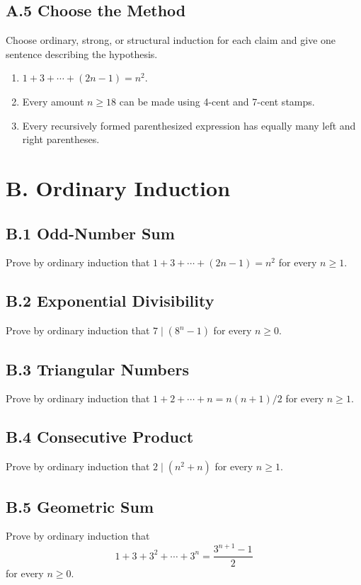 \documentclass[11pt]{article}
\begin{document}
\subsection*{A.5 Choose the Method}
Choose ordinary, strong, or structural induction for each claim and give one
sentence describing the hypothesis.
\begin{enumerate}[label=(\alph*)]
  \item $1+3+\cdots+(2n-1)=n^2$.
  \item Every amount $n\ge18$ can be made using 4-cent and 7-cent stamps.
  \item Every recursively formed parenthesized expression has equally many
        left and right parentheses.
\end{enumerate}

\newpage
\section*{B. Ordinary Induction}

\subsection*{B.1 Odd-Number Sum}
Prove by ordinary induction that
$1+3+\cdots+(2n-1)=n^2$ for every $n\ge1$.

\subsection*{B.2 Exponential Divisibility}
Prove by ordinary induction that $7\mid(8^n-1)$ for every $n\ge0$.

\subsection*{B.3 Triangular Numbers}
Prove by ordinary induction that
$1+2+\cdots+n=n(n+1)/2$ for every $n\ge1$.

\subsection*{B.4 Consecutive Product}
Prove by ordinary induction that $2\mid(n^2+n)$ for every $n\ge1$.

\subsection*{B.5 Geometric Sum}
Prove by ordinary induction that
\[
  1+3+3^2+\cdots+3^n=\frac{3^{n+1}-1}{2}
\]
for every $n\ge0$.
\end{document}

